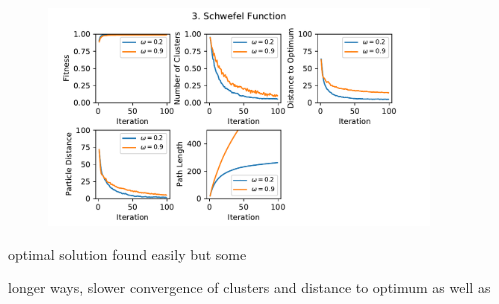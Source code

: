 \documentclass[12pt]{article}
\begin{document}
\begin{figure}
	\centering
	\includegraphics[width=0.9\textwidth]{figures/ex3/ex3-3.pdf}
	\label{fig:ex3-3}
\end{figure}


optimal solution found easily but some 

longer ways, slower convergence of clusters and distance to optimum as well as 
\end{document}
